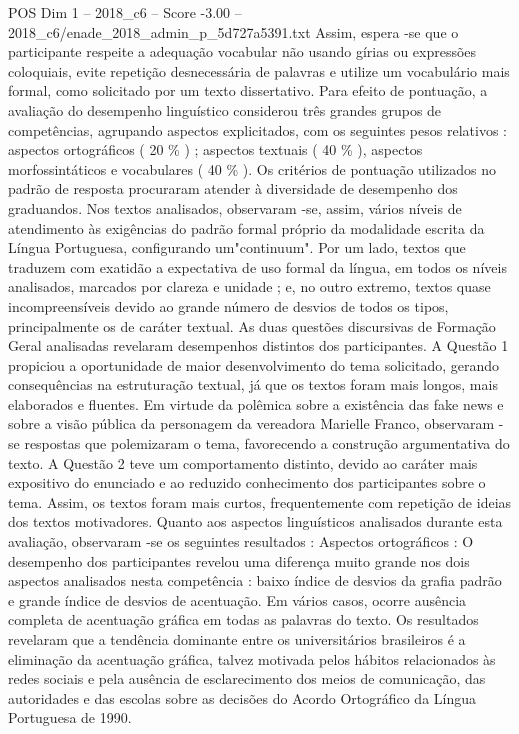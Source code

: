 \begin{textsample}{POS Dim 1 – 2018\_c6 – Score -3.00 – 2018\_c6/enade\_2018\_admin\_p\_5d727a5391.txt}
Assim, espera -se que o participante respeite a adequação vocabular não usando gírias ou expressões coloquiais, evite repetição desnecessária de palavras e utilize um vocabulário mais formal, como solicitado por um texto dissertativo.
Para efeito de pontuação, a avaliação do desempenho linguístico considerou três grandes grupos de competências, agrupando aspectos explicitados, com os seguintes pesos relativos : aspectos ortográficos ( 20 \% ) ; aspectos textuais ( 40 \% ), aspectos morfossintáticos e vocabulares ( 40 \% ).
Os critérios de pontuação utilizados no padrão de resposta procuraram atender à diversidade de desempenho dos graduandos.
Nos textos analisados, observaram -se, assim, vários níveis de atendimento às exigências do padrão formal próprio da modalidade escrita da Língua Portuguesa, configurando um"continuum".
Por um lado, textos que traduzem com exatidão a expectativa de uso formal da língua, em todos os níveis analisados, marcados por clareza e unidade ; e, no outro extremo, textos quase incompreensíveis devido ao grande número de desvios de todos os tipos, principalmente os de caráter textual.
As duas questões discursivas de Formação Geral analisadas revelaram desempenhos distintos dos participantes.
A Questão 1 propiciou a oportunidade de maior desenvolvimento do tema solicitado, gerando consequências na estruturação textual, já que os textos foram mais longos, mais elaborados e fluentes.
Em virtude da polêmica sobre a existência das fake news e sobre a visão pública da personagem da vereadora Marielle Franco, observaram -se respostas que polemizaram o tema, favorecendo a construção argumentativa do texto.
A Questão 2 teve um comportamento distinto, devido ao caráter mais expositivo do enunciado e ao reduzido conhecimento dos participantes sobre o tema.
Assim, os textos foram mais curtos, frequentemente com repetição de ideias dos textos motivadores.
Quanto aos aspectos linguísticos analisados durante esta avaliação, observaram -se os seguintes resultados : Aspectos ortográficos : O desempenho dos participantes revelou uma diferença muito grande nos dois aspectos analisados nesta competência : baixo índice de desvios da grafia padrão e grande índice de desvios de acentuação.
Em vários casos, ocorre ausência completa de acentuação gráfica em todas as palavras do texto.
Os resultados revelaram que a tendência dominante entre os universitários brasileiros é a eliminação da acentuação gráfica, talvez motivada pelos hábitos relacionados às redes sociais e pela ausência de esclarecimento dos meios de comunicação, das autoridades e das escolas sobre as decisões do Acordo Ortográfico da Língua Portuguesa de 1990.

\end{textsample}
